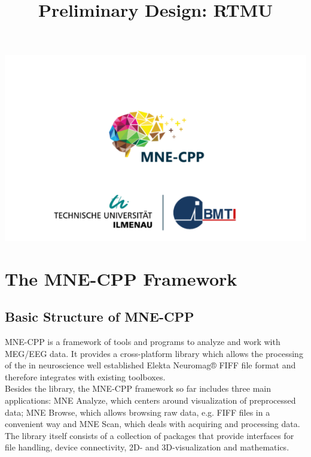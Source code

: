 





	
\title{Preliminary Design: RTMU}
\vspace{3 in}
\maketitle

\includegraphics[width = \linewidth]{figures/mne-cpp.png}

\clearpage


\tableofcontents

\clearpage
\section{The MNE-CPP Framework}

\subsection{Basic Structure of MNE-CPP}

MNE-CPP is a framework of tools and programs to analyze and work with MEG/EEG data.
It provides a cross-platform library which allows the processing of the in neuroscience well established Elekta Neuromag® FIFF file format and therefore integrates with existing toolboxes. \\
Besides the library, the MNE-CPP framework so far includes three main applications: MNE Analyze, which centers around visualization of preprocessed data; MNE Browse, which allows browsing raw data, e.g. FIFF files in a convenient way and MNE Scan, which deals with acquiring and processing data. \\
The library itself consists of a collection of packages that provide interfaces for file handling, device connectivity, 2D- and 3D-visualization and mathematics.


